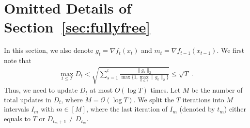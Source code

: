 \documentclass{article}
\theoremstyle{plain}
\newtheorem{theorem}{Theorem}[section]
\theoremstyle{definition}
\theoremstyle{remark}
\newcommand{\regret}{\mathfrak{R}}
\renewcommand{\tilde}{\widetilde}
\begin{document}
\section{Omitted Details of Section~\ref{sec:fullyfree}}\label{app:sec42}

In this section, we also denote $g_t=\nabla f_t(x_t)$ and $m_t=\nabla f_{t-1}(x_{t-1})$. We first note that 
\begin{align*}
\max_{t \leq T}D_t < \sqrt{\sum_{s=1}^t\frac{\|g_s \|_2}{\max\{1,\max_{k \leq s} \| g_k \|_2 \}}} \leq \sqrt{T}~.
\end{align*}
Thus, we need to update $D_t$ at most $O(\log T)$ times. Let $M$ be the number of total updates in $D_t$, where $M = \mathcal{O}(\log T)$. We split the $T$ iterations into $M$ intervals $I_m$ with $m\in[M]$, where the last iteration of $I_m$ (denoted by $t_m$) either equals to $T$ or $D_{t_m+1}\neq D_{t_m}$.

\end{document}
